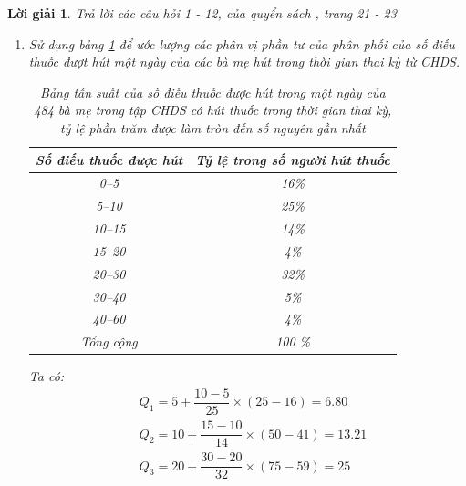 \documentclass[14pt, a4paper]{article}
\theoremstyle{sltheorem}
\theoremstyle{soltheorem}
\newtheorem*{loigiai}{Lời giải}
\begin{document}
\begin{loigiai}
    Trả lời các câu hỏi 1 - 12, của quyển sách \cite{nolan2001stat}, trang 21 - 23
    \begin{enumerate}[wide, labelwidth=!, labelindent=0pt,label=\textbf{\arabic*}.]
        \item Sử dụng bảng \ref{tb:1.3} để ước lượng các phân vị phần tư của phân phối của số điếu thuốc đượt hút một ngày của các bà mẹ hút trong thời gian thai kỳ từ CHDS.

            \begin{table}[h!]
                \begin{center}
                    \begin{tabular}{|c|c|}
                        \hline
                        \textbf{Số điếu thuốc được hút} & \textbf{Tỷ lệ trong số người hút thuốc} \\  
                        \hline
                        0--5 & 16\% \\  
                        5--10 & 25\% \\  
                        10--15 & 14\% \\  
                        15--20 & 4\% \\  
                        20--30 & 32\% \\  
                        30--40 & 5\% \\  
                        40--60 & 4\% \\  
                        \hline
                        Tổng cộng & 100 \% \\
                        \hline
                    \end{tabular}
                \end{center}
                \caption{Bảng tần suất của số điếu thuốc được hút trong một ngày của 484 bà mẹ trong tập CHDS có hút thuốc trong thời gian thai kỳ,
                tỷ lệ phần trăm được làm tròn đến số nguyên gần nhất}
                \label{tb:1.3}
            \end{table}
        
        Ta có:
        \begin{equation*}
            \begin{aligned}
                &Q_1 = 5 + \dfrac{10 - 5}{25} \times (25 - 16) = 6.80 \\
                &Q_2 = 10 + \dfrac{15 - 10}{14} \times (50 - 41) = 13.21 \\
                &Q_3 = 20 + \dfrac{30 - 20}{32} \times (75 - 59) = 25
            \end{aligned}
        \end{equation*}


\end{enumerate}
\end{loigiai}
\end{document}
